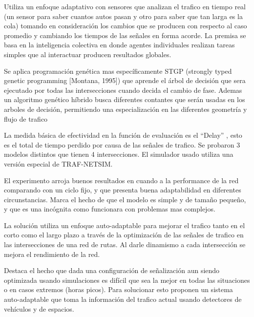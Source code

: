 \begin{itemize}
	\begin{item}
Utiliza un enfoque adaptativo con sensores que analizan el trafico en tiempo real (un sensor para saber cuantos autos pasan y otro para saber que tan larga es la cola) tomando en consideración los cambios que se producen con respecto al caso promedio y cambiando los tiempos de las señales en forma acorde.
La premisa se basa en la inteligencia colectiva en donde agentes individuales realizan tareas simples que al interactuar producen resultados globales.

Se aplica programación genética mas específicamente STGP (strongly typed genetic programming [Montana, 1995]) que aprende el árbol de decisión que sera ejecutado por todas las intersecciones cuando decida el cambio de fase. Ademas un algoritmo genético híbrido busca diferentes contantes que serán usadas en los arboles de decisión, permitiendo una especialización en las diferentes geometría y flujo de trafico

La medida básica de efectividad en la función de evaluación es el “Delay” , esto es el total de tiempo perdido por causa de las señales de trafico. Se probaron 3 modelos distintos que tienen 4 intersecciones.
El simulador usado utiliza una versión especial de TRAF-NETSIM.

El experimento arroja buenos resultados en cuando a la performance de la red comparando con un ciclo fijo, y que presenta buena adaptabilidad en diferentes circunstancias. Marca el hecho de que el modelo es simple y de tamaño pequeño, y que es una incógnita como funcionara con problemas mas complejos.
	
	\end{item}	


	\begin{item}
		\bibentry{Vogel2000}

La solución utiliza un enfoque auto-adaptable para mejorar el trafico tanto en el corto como el largo plazo a través de la optimización de las señales de trafico en las intersecciones de una red de rutas. Al darle dinamismo a cada intersección se mejora el rendimiento de la red.

Destaca el hecho que dada una configuración de señalización aun siendo optimizada usando simulaciones es difícil que sea la mejor en todas las situaciones o en casos extremos (horas picos). Para solucionar esto proponen un sistema auto-adaptable que toma la información del trafico actual usando detectores de vehículos y de espacios.


\end{item}
\end{itemize}
